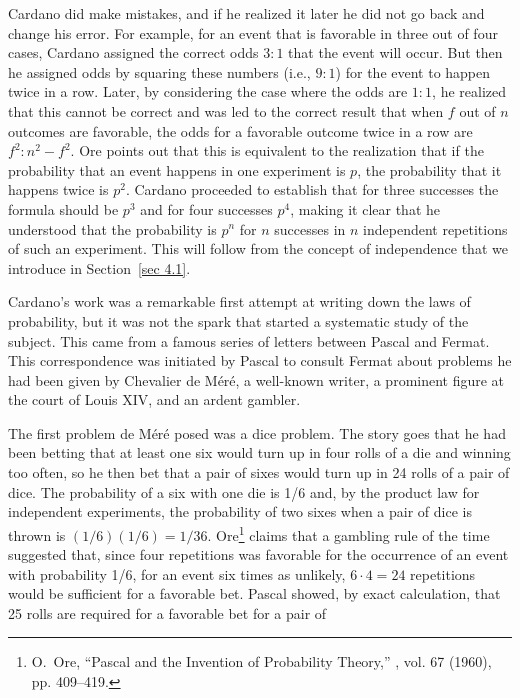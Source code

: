 Cardano did make mistakes, and if he realized it later he did not go back and
change his error.  For example, for an event that is favorable in three out
of
four cases, Cardano assigned the correct odds $3 : 1$ that the event will
occur.  But then he assigned odds by squaring these numbers (i.e., $9 :
1$) for the event to happen twice in a row.  Later, by considering the case
where the odds are $1 : 1$, he realized that this cannot be correct and
was led to the correct result that when $f$ out of $n$ outcomes are
favorable, the odds for a favorable outcome twice in a row are $f^2 : n^2 -
f^2$.  Ore points out that this is equivalent to the realization that if the
probability that an event happens in one experiment is $p$, the probability
that
it happens twice is $p^2$.  Cardano proceeded to establish that for three
successes the formula should be $p^3$ and for four successes $p^4$, making it
clear that he understood that the probability is $p^n$ for $n$ successes in
$n$
independent repetitions of such an experiment.  This will follow from the
concept of independence that we introduce in Section~\ref{sec 4.1}. 
\par
Cardano's work was a remarkable first attempt at writing down the laws of
probability, but it was not the spark that started a systematic study of the
subject.  This came from a famous series of letters between Pascal and Fermat. 
This correspondence was initiated by Pascal to consult Fermat about problems he
had been given by Chevalier de M\'er\'e, a well-known writer, a
prominent figure at the court of Louis XIV, and an ardent gambler.
\par
The first problem de M\'er\'e posed was a dice problem.  The story goes that he
had been betting that at least one six would turn up in four rolls of a die and
winning too often, so he then bet that a pair of sixes would turn up in 24
rolls of a pair of dice.  The probability of a six with one die is 1/6 and, by
the product law for independent experiments, the probability of two sixes when
a pair of dice is thrown is $(1/6)(1/6) = 1/36$.  Ore\footnote{O.\ Ore,
``Pascal and the Invention of Probability Theory,'' , vol. 67 (1960), pp. 409--419.} claims that a gambling rule of the
time suggested that, since four repetitions was favorable for the occurrence of
an event with probability 1/6, for an event six times as unlikely, $6 \cdot 4 =
24$ repetitions would be sufficient for a favorable bet.  Pascal showed, by
exact calculation, that 25 rolls are required for a favorable bet for a pair of
